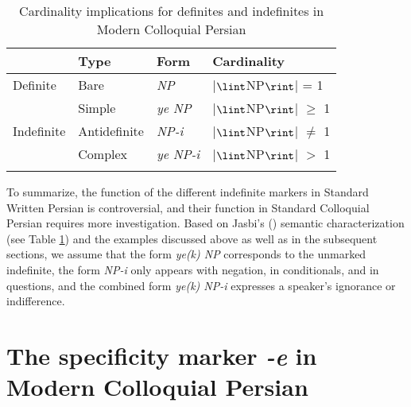 \documentclass[output=paper]{langsci/langscibook}
\begin{document}
\begin{table}

\begin{tabularx}{\textwidth}{XXXl}
\lsptoprule
 		& Type 	& Form 	& Cardinality \\
\midrule
Definite 	& Bare 	& {\emph{NP}} 	& |$\lint$NP$\rint$| = 1 \\[1mm]
\hdashline
		& Simple		& {\emph{ye NP}}	& |$\lint$NP$\rint$| $\geq$ 1 \\
Indefinite	& Antidefinite 	& {\emph{NP-i}}		& |$\lint$NP$\rint$| $\not=$ 1 \\
		& Complex		& {\emph{ye NP-i}}	& |$\lint$NP$\rint$| $>$ 1 \\
\lspbottomrule
\end{tabularx}
\caption{Cardinality implications for definites and indefinites in Modern Colloquial Persian \citep[][251]{jasbi:16}}\label{4table:4}
\end{table}

{
To summarize, the function of the different indefinite markers in Standard Written Persian is controversial, and their function in Standard Colloquial Persian requires more investigation. Based on Jasbi's (\citeyear{jasbi:16}) semantic characterization (see Table \ref{4table:4}) and the examples discussed above as well as in the subsequent sections, we assume that the form {\emph{ye(k) NP}} corresponds to the unmarked indefinite, the form {\emph{NP-i}} only appears with negation, in conditionals, and in questions, and the combined form {\emph{ye(k) NP-i}} expresses a speaker's ignorance or indifference.
}


\section{The specificity marker {\emph{-e}} in Modern Colloquial Persian}\label{4sec:4}
\end{document}
